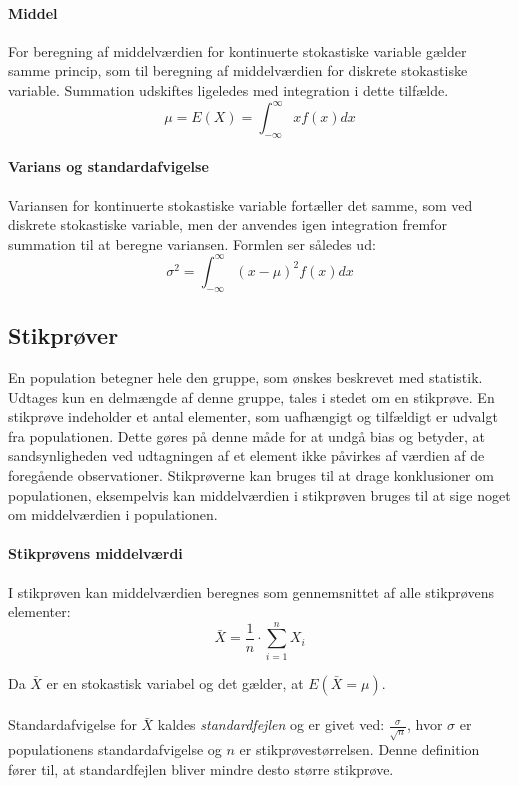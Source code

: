 \paragraph{Middel} For beregning af middelværdien for kontinuerte stokastiske variable gælder samme princip, som til beregning af middelværdien for diskrete stokastiske variable. Summation udskiftes ligeledes med integration i dette tilfælde.
$$\mu=E(X)=\int_{-\infty}^{\infty}xf(x)dx$$

\paragraph{Varians og standardafvigelse} Variansen for kontinuerte stokastiske variable fortæller det samme, som ved diskrete stokastiske variable, men der anvendes igen integration fremfor summation til at beregne variansen. Formlen ser således ud:
$$\sigma^2=\int_{-\infty}^{\infty}(x-\mu)^2f(x)dx$$ 


\subsection{Stikprøver}
En population betegner hele den gruppe, som ønskes beskrevet med statistik. Udtages kun en delmængde af denne gruppe, tales i stedet om en stikprøve.
En stikprøve indeholder et antal elementer, som uafhængigt og tilfældigt er udvalgt fra populationen. Dette gøres på denne måde for at undgå bias og betyder, at sandsynligheden ved udtagningen af et element ikke påvirkes af værdien af de foregående observationer.
Stikprøverne kan bruges til at drage konklusioner om populationen, eksempelvis kan middelværdien i stikprøven bruges til at sige noget om middelværdien i populationen. 

\paragraph{Stikprøvens middelværdi} I stikprøven kan middelværdien beregnes som gennemsnittet af alle stikprøvens elementer:
$$\bar{X}=\frac{1}{n} \cdot \sum_{i=1}^{n} X_i $$

\noindent Da $\bar{X}$ er en stokastisk variabel og det gælder, at $E(\bar{X}=\mu)$.
\\
\\
\noindent Standardafvigelse for $\bar{X}$ kaldes \emph{standardfejlen} og er givet ved: $\frac{\sigma}{\sqrt{n}}$, hvor $\sigma$ er populationens standardafvigelse og $n$ er stikprøvestørrelsen. Denne definition fører til, at standardfejlen bliver mindre desto større stikprøve.


